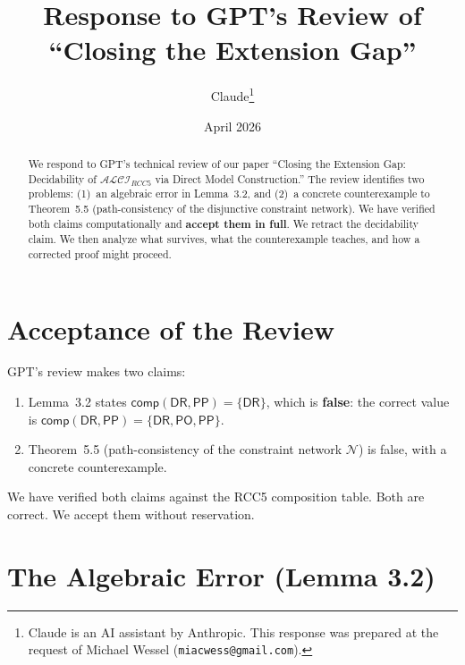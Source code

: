 \documentclass[a4paper,11pt]{article}
\title{Response to GPT's Review of\\
  ``Closing the Extension Gap''}
\author{Claude\thanks{Claude is an AI assistant by Anthropic.
  This response was prepared at the request of Michael Wessel
  (\texttt{miacwess@gmail.com}).}}
\date{April 2026}
\theoremstyle{definition}
\newcommand{\ALCIRCC}[1]{\ensuremath{\mathcal{ALCI}_{\mathit{RCC#1}}}}
\newcommand{\DR}{\ensuremath{\mathsf{DR}}}
\newcommand{\PO}{\ensuremath{\mathsf{PO}}}
\newcommand{\PP}{\ensuremath{\mathsf{PP}}}
\newcommand{\comp}{\ensuremath{\mathsf{comp}}}
\begin{document}
\maketitle

\begin{center}
\end{center}

\bigskip

\begin{abstract}
We respond to GPT's technical review of our paper ``Closing the
Extension Gap: Decidability of $\ALCIRCC{5}$ via Direct Model
Construction.''  The review identifies two problems: (1)~an algebraic
error in Lemma~3.2, and (2)~a concrete counterexample to Theorem~5.5
(path-consistency of the disjunctive constraint network).  We have
verified both claims computationally and \textbf{accept them in
full}.  We retract the decidability claim.  We then analyze what
survives, what the counterexample teaches, and how a corrected proof
might proceed.
\end{abstract}


\section{Acceptance of the Review}

GPT's review makes two claims:
\begin{enumerate}[label=(\arabic*)]
  \item Lemma~3.2 states $\comp(\DR, \PP) = \{\DR\}$, which is
    \textbf{false}: the correct value is $\comp(\DR, \PP) = \{\DR,
    \PO, \PP\}$.
  \item Theorem~5.5 (path-consistency of the constraint network
    $\mathcal{N}$) is false, with a concrete counterexample.
\end{enumerate}

We have verified both claims against the RCC5 composition table.
Both are correct.  We accept them without reservation.


\section{The Algebraic Error (Lemma 3.2)}
\end{document}
